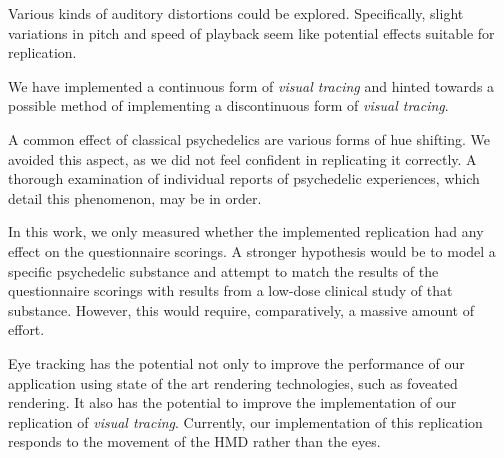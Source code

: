 Various kinds of auditory distortions could be explored. Specifically, slight variations in pitch and speed of playback seem like potential effects suitable for replication.

We have implemented a continuous form of \textit{visual tracing} and hinted towards a possible method of implementing a discontinuous form of \textit{visual tracing}.

A common effect of classical psychedelics are various forms of hue shifting. We avoided this aspect, as we did not feel confident in replicating it correctly. A thorough examination of individual reports of psychedelic experiences, which detail this phenomenon, may be in order.

In this work, we only measured whether the implemented replication had any effect on the questionnaire scorings. A stronger hypothesis would be to model a specific psychedelic substance and attempt to match the results of the questionnaire scorings with results from a low-dose clinical study of that substance. However, this would require, comparatively, a massive amount of effort.

Eye tracking has the potential not only to improve the performance of our application using state of the art rendering technologies, such as foveated rendering. It also has the potential to improve the implementation of our replication of \textit{visual tracing}. Currently, our implementation of this replication responds to the movement of the \ac{HMD} rather than the eyes.

